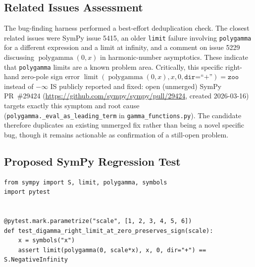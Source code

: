 \documentclass[11pt]{article}
\begin{document}
\subsection{Related Issues Assessment}

The bug-finding harness performed a best-effort deduplication check. The closest related issues were SymPy issue 5415, an older \texttt{limit} failure involving \texttt{polygamma} for a different expression and a limit at infinity, and a comment on issue 5229 discussing \(\operatorname{polygamma}(0,x)\) in harmonic-number asymptotics. These indicate that \texttt{polygamma} limits are a known problem area. Critically, this specific right-hand zero-pole sign error \(\operatorname{limit}(\operatorname{polygamma}(0,x),x,0,\texttt{dir=``+''})=\mathtt{zoo}\) instead of \(-\infty\) IS publicly reported and fixed: open (unmerged) SymPy PR~\#29424 (\url{https://github.com/sympy/sympy/pull/29424}, created 2026-03-16) targets exactly this symptom and root cause (\texttt{polygamma.\_eval\_as\_leading\_term} in \texttt{gamma\_functions.py}). The candidate therefore duplicates an existing unmerged fix rather than being a novel specific bug, though it remains actionable as confirmation of a still-open problem.

\subsection{Proposed SymPy Regression Test}

\medskip

\begin{lstlisting}[style=bugpython]
from sympy import S, limit, polygamma, symbols
import pytest


@pytest.mark.parametrize("scale", [1, 2, 3, 4, 5, 6])
def test_digamma_right_limit_at_zero_preserves_sign(scale):
    x = symbols("x")
    assert limit(polygamma(0, scale*x), x, 0, dir="+") == S.NegativeInfinity
\end{lstlisting}
\end{document}

